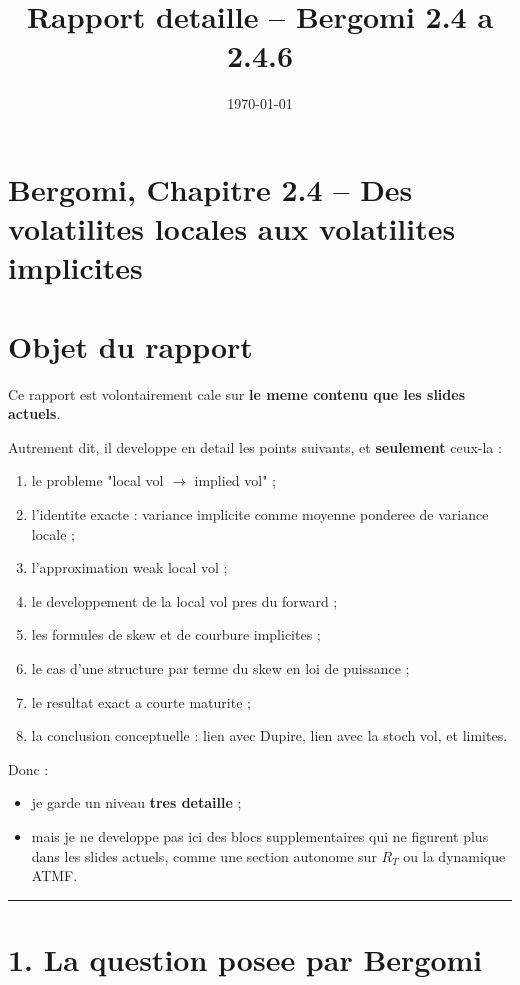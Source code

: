 \documentclass[11pt,a4paper]{article}
\title{Rapport detaille -- Bergomi 2.4 a 2.4.6}
\author{}
\date{\today}
\begin{document}
\maketitle
\tableofcontents
\newpage
\section{Bergomi, Chapitre 2.4 -- Des volatilites locales aux volatilites implicites}

\section{Objet du rapport}

Ce rapport est volontairement cale sur \textbf{le meme contenu que les slides actuels}.

Autrement dit, il developpe en detail les points suivants, et \textbf{seulement} ceux-la :

\begin{enumerate}
\item le probleme "local vol \(\to\) implied vol" ;
\item l'identite exacte : variance implicite comme moyenne ponderee de variance locale ;
\item l'approximation weak local vol ;
\item le developpement de la local vol pres du forward ;
\item les formules de skew et de courbure implicites ;
\item le cas d'une structure par terme du skew en loi de puissance ;
\item le resultat exact a courte maturite ;
\item la conclusion conceptuelle : lien avec Dupire, lien avec la stoch vol, et limites.
\end{enumerate}

Donc :

\begin{itemize}
\item je garde un niveau \textbf{tres detaille} ;
\item mais je ne developpe pas ici des blocs supplementaires qui ne figurent plus dans les slides actuels, comme une section autonome sur \(R_T\) ou la dynamique ATMF.
\end{itemize}

\bigskip\hrule\bigskip

\section{1. La question posee par Bergomi}
\end{document}

